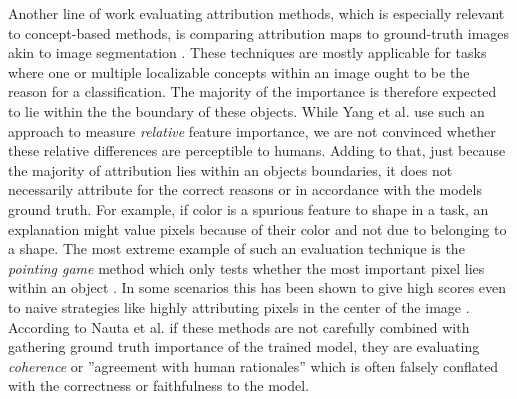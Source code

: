 Another line of work evaluating attribution methods, which is especially relevant to concept-based methods, is comparing attribution maps to ground-truth images akin to image segmentation \cite{Kim2018,Yang2019,Bau2020,Arras2022,Clark2023}. These techniques are mostly applicable for tasks where one or multiple localizable concepts within an image ought to be the reason for a classification. The majority of the importance is therefore expected to lie within the the boundary of these objects. While Yang et al. \cite{Yang2019} use such an approach to measure \textit{relative} feature importance, we are not convinced whether these relative differences are perceptible to humans. Adding to that, just because the majority of attribution lies within an objects boundaries, it does not necessarily attribute for the correct reasons or in accordance with the models ground truth. For example, if color is a spurious feature to shape in a task, an explanation might value pixels because of their color and not due to belonging to a shape. The most extreme example of such an evaluation technique is the \textit{pointing game} method which only tests whether the most important pixel lies within an object \cite{Zhang2016}. In some scenarios this has been shown to give high scores even to naive strategies like highly attributing pixels in the center of the image \cite{Gu2019}. According to Nauta et al. \cite{Nauta2023} if these methods are not carefully combined with gathering ground truth importance of the trained model, they are evaluating \textit{coherence} or ''agreement with human rationales'' which is often falsely conflated with the correctness or faithfulness to the model. 
\\


